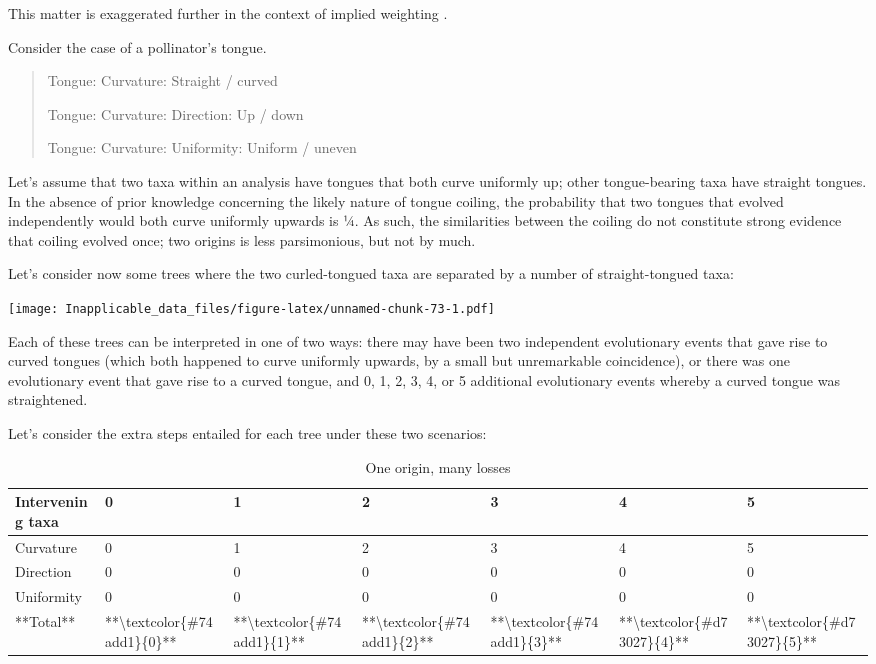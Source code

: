 \documentclass[]{book}
\theoremstyle{definition}
\theoremstyle{definition}
\theoremstyle{definition}
\theoremstyle{remark}
\begin{document}
This matter is exaggerated further in the context of implied weighting
\citep{Goloboff1993, Goloboff2014}.

Consider the case of a pollinator's tongue.

\begin{quote}
Tongue: Curvature: Straight / curved

Tongue: Curvature: Direction: Up / down

Tongue: Curvature: Uniformity: Uniform / uneven
\end{quote}

Let's assume that two taxa within an analysis have tongues that both
curve uniformly up; other tongue-bearing taxa have straight tongues. In
the absence of prior knowledge concerning the likely nature of tongue
coiling, the probability that two tongues that evolved independently
would both curve uniformly upwards is ¼. As such, the similarities
between the coiling do not constitute strong evidence that coiling
evolved once; two origins is less parsimonious, but not by much.

Let's consider now some trees where the two curled-tongued taxa are
separated by a number of straight-tongued taxa:

\texttt{[image: Inapplicable\_data\_files/figure-latex/unnamed-chunk-73-1.pdf]}

Each of these trees can be interpreted in one of two ways: there may
have been two independent evolutionary events that gave rise to curved
tongues (which both happened to curve uniformly upwards, by a small but
unremarkable coincidence), or there was one evolutionary event that gave
rise to a curved tongue, and 0, 1, 2, 3, 4, or 5 additional evolutionary
events whereby a curved tongue was straightened.

Let's consider the extra steps entailed for each tree under these two
scenarios:

\begin{table}

\caption{\label{tab:iw-delaet-ew-a}One origin, many losses}
\centering
\begin{tabular}[t]{l|l|l|l|l|l|l}
\hline
Intervening taxa & 0 & 1 & 2 & 3 & 4 & 5\\
\hline
Curvature & 0 & 1 & 2 & 3 & 4 & 5\\
\hline
Direction & 0 & 0 & 0 & 0 & 0 & 0\\
\hline
Uniformity & 0 & 0 & 0 & 0 & 0 & 0\\
\hline
**Total** & **\textbackslash{}textcolor\{\#74add1\}\{0\}** & **\textbackslash{}textcolor\{\#74add1\}\{1\}** & **\textbackslash{}textcolor\{\#74add1\}\{2\}** & **\textbackslash{}textcolor\{\#74add1\}\{3\}** & **\textbackslash{}textcolor\{\#d73027\}\{4\}** & **\textbackslash{}textcolor\{\#d73027\}\{5\}**\\
\hline
\end{tabular}
\end{table}
\end{document}
